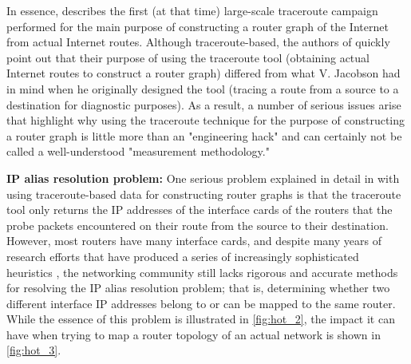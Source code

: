 In essence, \cite{pansiot98:_inter} describes the first (at that time)
large-scale traceroute campaign performed for the main purpose of
constructing a router graph of the Internet from actual Internet
routes. Although traceroute-based, the authors of
\cite{pansiot98:_inter} quickly point out that their purpose of using
the traceroute tool (\ie obtaining actual Internet routes to
construct a router graph) differed from what V. Jacobson
\cite{jacobson89:_tracer} had in mind when he originally designed the
tool (\ie tracing a route from a source to a destination for
diagnostic purposes).  As a result, a number of serious issues arise
that highlight why using the traceroute technique for the purpose of
constructing a router graph is little more than an "engineering hack"
and can certainly not be called a well-understood "measurement
methodology."

{\bf IP alias resolution problem:} One serious problem
explained in detail in \cite{pansiot98:_inter} with using traceroute-based data for
constructing router graphs is that the traceroute tool only returns
the IP addresses of the interface cards of the routers that the probe
packets encountered on their route from the source to their
destination.  However, most routers have many interface cards, and
despite many years of research efforts that have produced a series of
increasingly sophisticated heuristics \cite{bender08:_fixin_allys,gunes09:_resol_ip_inter,sherry10:_resol_ip_alias_presp_times}, the networking
community still lacks rigorous and accurate methods for resolving the
IP alias resolution problem; that is, determining whether two
different interface IP addresses belong to or can be mapped to the
same router. While the essence of this problem is illustrated in
\autoref{fig:hot_2}, the impact it can have when trying to map a
router topology of an actual network is shown in \autoref{fig:hot_3}.


